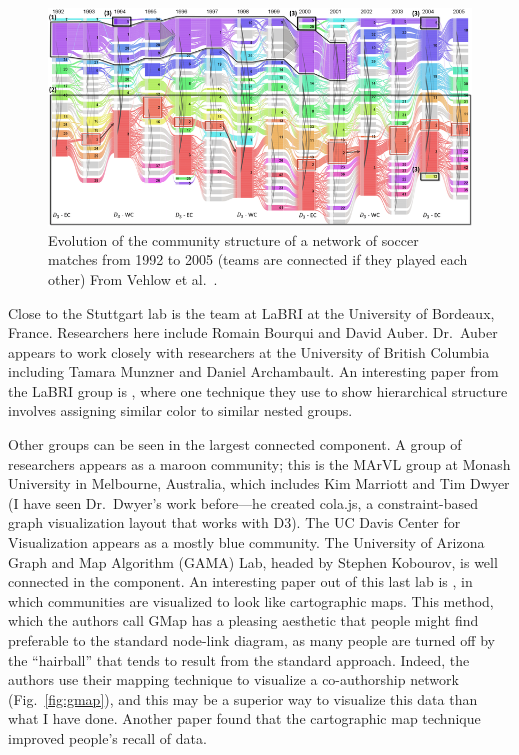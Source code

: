 \begin{figure}
\centering
\includegraphics{img/vehlow2015_fig7_dynamic.png}
\caption{Evolution of the community structure of a network of soccer
matches from 1992 to 2005 (teams are connected if they played each
other) From Vehlow et
al.~\autocite{vehlow_visualizing_2015}.}\label{fig:vehlow}
\end{figure}

Close to the Stuttgart lab is the team at LaBRI at the University of
Bordeaux, France. Researchers here include Romain Bourqui and David
Auber. Dr.~Auber appears to work closely with researchers at the
University of British Columbia including Tamara Munzner and Daniel
Archambault. An interesting paper from the LaBRI group is
\autocite{sansen_adjasankey:_2015}, where one technique they use to show
hierarchical structure involves assigning similar color to similar
nested groups.

Other groups can be seen in the largest connected component. A group of
researchers appears as a maroon community; this is the MArVL group at
Monash University in Melbourne, Australia, which includes Kim Marriott
and Tim Dwyer (I have seen Dr.~Dwyer's work before---he created cola.js,
a constraint-based graph visualization layout that works with D3). The
UC Davis Center for Visualization appears as a mostly blue community.
The University of Arizona Graph and Map Algorithm (GAMA) Lab, headed by
Stephen Kobourov, is well connected in the component. An interesting
paper out of this last lab is \autocite{gansner_gmap:_2010}, in which
communities are visualized to look like cartographic maps. This method,
which the authors call GMap has a pleasing aesthetic that people might
find preferable to the standard node-link diagram, as many people are
turned off by the ``hairball'' that tends to result from the standard
approach. Indeed, the authors use their mapping technique to visualize a
co-authorship network (Fig.~\ref{fig:gmap}), and this may be a superior
way to visualize this data than what I have done. Another paper
\autocite{saket_map-based_2015} found that the cartographic map
technique improved people's recall of data.

